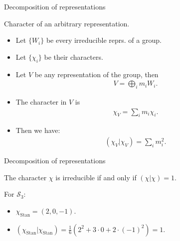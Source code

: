 \documentclass[10pt]{beamer}
\newcommand{\Sym}{\mathcal{S}}
\newcommand{\Stan}{\text{Stan}}
\begin{document}
	\begin{frame}{Decomposition of representations}
		\begin{block}{Character of an arbitrary representation.}
			\begin{itemize}
				
				\item Let $\{W_i\}$ be every irreducible reprs. of a group.
				
				\item Let $\{\chi_i\}$ be their characters.
				
				\item Let $V$ be any representation of the group, then \begin{align*}
					V = \bigoplus_i m_i W_i.
				\end{align*}
				
				\item The character in $V$ is \begin{align*}
					\chi_V = \sum_i m_i \chi_i.
				\end{align*}
  				
				\item Then we have: \begin{align*}
					(\chi_V|\chi_V) = \sum_i m_i^2.
				\end{align*}
			\end{itemize}
		\end{block}
	\end{frame}
	
	\begin{frame}{Decomposition of representations}
		\begin{theorem}
			The character $\chi$ is irreducible if and only if $(\chi|\chi) = 1$.
		\end{theorem}
		
		\begin{example}
			For $\Sym_3$: 
			\begin{itemize}
				\item $\chi_\Stan = (2,0,-1)$.
				\item $(\chi_\Stan|\chi_\Stan) = \frac{1}{6}\left(2^2 + 3 \cdot 0 + 2 \cdot (-1)^2\right) = 1$.
			\end{itemize}
		\end{example}
		
	\end{frame}	
%			
%			
	
\end{document}
